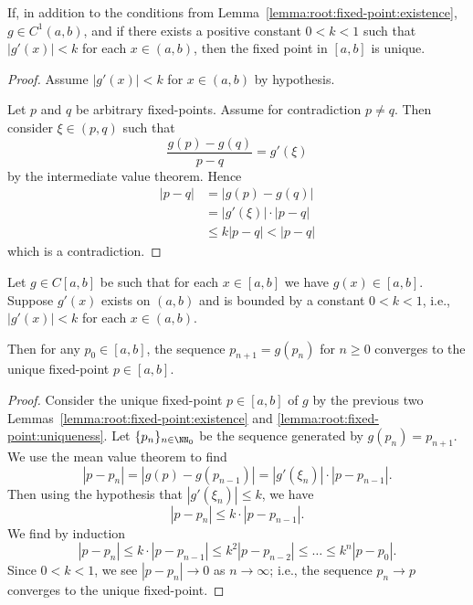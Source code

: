 \begin{lemma}\label{lemma:root:fixed-point:uniqueness}
  If, in addition to the conditions from
  Lemma~\ref{lemma:root:fixed-point:existence},
  $g\in C^{1}(a,b)$, and if there exists a positive
  constant $0<k<1$ such that $|g'(x)|<k$ for each $x\in(a,b)$,
  then the fixed point in $[a,b]$ is unique.
\end{lemma}
\begin{proof}
  Assume $|g'(x)|<k$ for $x\in(a,b)$ by hypothesis.

  Let $p$ and $q$ be arbitrary fixed-points.
  Assume for contradiction $p\neq q$.
  Then consider $\xi\in(p,q)$ such that
  \begin{equation}
    \frac{g(p)-g(q)}{p-q} = g'(\xi)
  \end{equation}
  by the intermediate value theorem.
  Hence
  \begin{subequations}
    \begin{align}
      |p-q| &= |g(p)-g(q)|\\
      &= |g'(\xi)|\cdot|p-q|\\
      &\leq k|p-q| < |p-q|
    \end{align}
  \end{subequations}
  which is a contradiction.
\end{proof}

\begin{thm}\label{thm:root:fixed-point:fixed-point-thm}
  Let $g\in C[a,b]$ be such that for each $x\in[a,b]$ we have $g(x)\in[a,b]$.
  Suppose $g'(x)$ exists on $(a,b)$ and is bounded by a constant
  $0<k<1$, i.e., $|g'(x)| < k$ for each $x\in(a,b)$.

  Then for any $p_{0}\in[a,b]$, the sequence $p_{n+1}=g(p_{n})$ for
  $n\geq0$ converges to the unique fixed-point $p\in[a,b]$.
\end{thm}
\begin{proof}
  Consider the unique fixed-point $p\in[a,b]$ of $g$ by the previous two
  Lemmas~\ref{lemma:root:fixed-point:existence} and
  \ref{lemma:root:fixed-point:uniqueness}.
  Let $\{p_{n}\}_{n\in\NN_{0}}$ be the sequence generated by $g(p_{n})=p_{n+1}$.
  We use the mean value theorem to find
  \begin{equation}
    |p-p_{n}| = |g(p)-g(p_{n-1})| = |g'(\xi_{n})|\cdot |p - p_{n-1}|.
  \end{equation}
  Then using the hypothesis that $|g'(\xi_{n})|\leq k$, we have
  \begin{equation}
    |p-p_{n}|\leq k\cdot|p-p_{n-1}|.
  \end{equation}
  We find by induction
  \begin{equation}\label{eq:root:fixed-point:bounds-on-diff}
    |p-p_{n}|\leq k\cdot|p-p_{n-1}|\leq k^{2}|p-p_{n-2}|\leq\dots\leq k^{n}|p-p_{0}|.
  \end{equation}
  Since $0<k<1$, we see $|p-p_{n}|\to 0$ as $n\to\infty$; i.e.,
  the sequence $p_{n}\to p$ converges to the unique fixed-point.
\end{proof}

